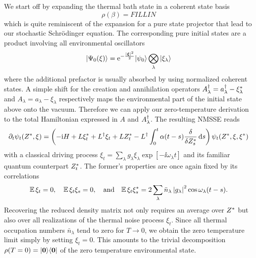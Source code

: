 We start off by expanding the thermal bath state in a coherent state basis \cite{WaMi08_quantum_optics}
\begin{equation*}
  \rho(\beta) = FILL IN
\end{equation*}
which is quite reminiscent of the expansion for a pure state projector that lead to our stochastic Schrödinger equation.
The corresponding pure initial states are a product involving all environmental oscillators
\begin{equation*}
  \ket{\Psi_0(\xi)} = \exp[-\frac{\abs{\vec\xi}^2}{2}] \ket{\psi_0} \bigotimes_\lambda \ket{\xi_\lambda}
\end{equation*}
where the additional prefactor is usually absorbed by using normalized coherent states.
A simple shift for the creation and annihilation operators $A^\dagger_\lambda = a^\dagger_\lambda - {\xi}^*_\lambda$ and $A_\lambda = a_\lambda - \xi_\lambda$ respectively maps the environmental part of the initial state above onto the vacuum.
Therefore we can apply our zero-temperature derivation to the total Hamiltonian expressed in $A$ and $A^\dagger_\lambda$.
The resulting NMSSE reads
\begin{equation}
  \partial_t \psi_t({Z}^*, \xi) = \left( -\mathrm{i}H + L{\xi}^*_t + L^\dagger\xi_t + L{Z}^*_t - L^\dagger\int_0^t \alpha(t - s) \frac{\delta}{\delta {Z}^*_s} \, \mathrm{d} s \right) \psi_t({Z}^*, \xi, {\xi}^*)
  \label{eq:nmqsd.nmsse_thermal_classic}
\end{equation}
with a classical driving process $\xi_t = \sum_\lambda g_\lambda \xi_\lambda \exp[-\ii \omega_\lambda t]$ and its familiar quantum counterpart ${Z}^*_t$.
The former's properties are once again fixed by its correlations
\begin{equation*}
  \E\,\xi_t = 0, \quad \E\,\xi_t \xi_s =0, \quad\mbox{and}\quad \E\,\xi_t \cc{\xi}_s = 2\sum_\lambda \bar n_\lambda \abs{g_\lambda}^2 \cos{\omega_\lambda(t-s)}.
  \label{eq:nmqsd.process_properties}
\end{equation*}
Recovering the reduced density matrix not only requires an average over ${Z}^*$ but also over all realizations of the thermal noise process $\xi_t$.
Since all thermal occupation numbers $\bar n_\lambda$ tend to zero for $T \to 0$, we obtain the zero temperature limit simply by setting $\xi_t = 0$.
This amounts to the trivial decomposition $\rho(T = 0) = | \boldsymbol{0} \rangle\langle \boldsymbol{0} |$ of the zero temperature environmental state.

